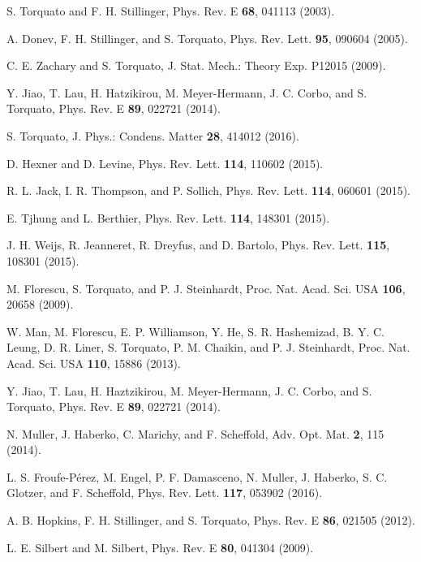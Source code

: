 \documentclass[aps,pre,twocolumn,superscriptaddress]{revtex4-1}
\begin{document}
\begin{thebibliography}{99} 

S. Torquato and F. H. Stillinger, 
Phys. Rev. E {\bf 68}, 041113 (2003).

A. Donev, F. H. Stillinger, and S. Torquato, 
Phys. Rev. Lett. {\bf 95}, 090604 (2005).

C. E. Zachary and S. Torquato, 
J. Stat. Mech.: Theory Exp. P12015 (2009).

Y. Jiao, T. Lau, H. Hatzikirou, M. Meyer-Hermann, J. C. Corbo, and S. Torquato, 
Phys. Rev. E {\bf 89}, 022721 (2014).

S. Torquato, J. Phys.: Condens. Matter {\bf 28}, 414012 (2016).

D. Hexner and D. Levine, Phys. Rev. Lett. {\bf 114}, 110602 (2015).

R. L. Jack, I. R. Thompson, and P. Sollich, 
Phys. Rev. Lett. {\bf 114}, 060601 (2015).

E. Tjhung and L. Berthier, 
Phys. Rev. Lett. {\bf 114}, 148301 (2015). 

J. H. Weijs, R. Jeanneret, R. Dreyfus, and D. Bartolo,
Phys. Rev. Lett. {\bf 115}, 108301 (2015).

M. Florescu, S. Torquato, and P. J. Steinhardt, 
Proc. Nat. Acad. Sci. USA {\bf 106}, 20658 (2009).

W. Man, M. Florescu, E. P. Williamson, Y. He, S. R.
Hashemizad, B. Y. C. Leung, D. R. Liner, S. Torquato,
P. M. Chaikin, and P. J. Steinhardt, 
Proc. Nat. Acad. Sci. USA {\bf 110}, 15886 (2013).

Y. Jiao, T. Lau, H. Haztzikirou, M. Meyer-Hermann,
J. C. Corbo, and S. Torquato, Phys. Rev. E {\bf 89}, 022721 (2014).

N. Muller, J. Haberko, C. Marichy, and F. Scheffold,
Adv. Opt. Mat. {\bf 2}, 115 (2014).

L. S. Froufe-P\'erez, M. Engel, P. F. Damasceno, N. Muller, J. Haberko, 
S. C. Glotzer, and F. Scheffold, Phys. Rev. Lett. {\bf 117}, 053902 (2016). 

A. B. Hopkins, F. H. Stillinger, and S. Torquato, 
Phys. Rev. E {\bf 86}, 021505 (2012).

L. E. Silbert and M. Silbert, 
Phys. Rev. E {\bf 80}, 041304 (2009).


\end{thebibliography}
\end{document}
